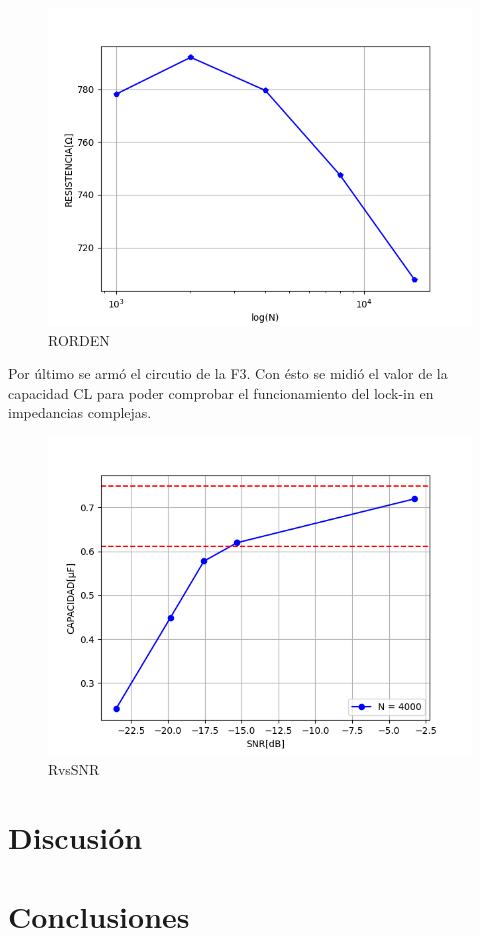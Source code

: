 \documentclass[11pt,a4paper]{extarticle}
\begin{document}
\begin{multicols}{2}
\begin{figure}[H]
	\centering
	\includegraphics[width=\linewidth]{Images/RORDEN.png}
	\caption{RORDEN}
	\label{fig:RORDEN}
\end{figure}

Por último se armó el circutio de la F3. Con ésto 
se midió el valor de la capacidad CL para poder 
comprobar el funcionamiento del lock-in en 
impedancias complejas.

\begin{figure}[H]
	\centering
	\includegraphics[width=\linewidth]{Images/CvsSNR(segunda).png}
	\caption{RvsSNR}
	\label{fig:CvsSNR}
\end{figure}


\section{Discusión}

\section{Conclusiones}






\end{multicols}
\end{document}
